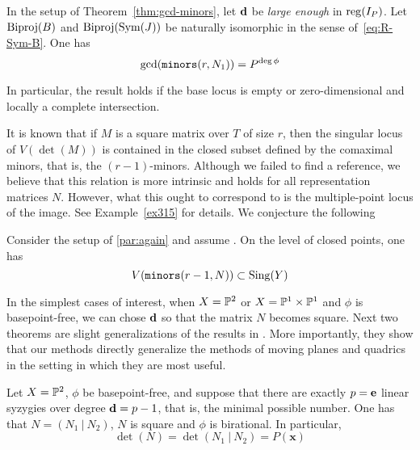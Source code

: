 \documentclass[fleqn,reqno]{amsart}
\begin{document}
\begin{corollary}
\label{cor:approx-complex}
In the setup of Theorem~\ref{thm:gcd-minors}, let $\mathbf d$ be {\em large enough} in $\operatorname{reg}(I_P)$.
Let $\operatorname{Biproj}(B)$ and $\operatorname{Biproj}(\operatorname{Sym}(J))$ be naturally isomorphic in the sense of~\eqref{eq:R-Sym-B}.
One has
\[
	\gcd(\mathop{\tt minors}(r, N_1))=P^{\deg\phi}
\]

In particular, the result holds if the base locus is empty or
zero-dimensional and locally a complete intersection.
\end{corollary}

\begin{paragraf*}
It is known that if $M$ is a square matrix over $T$ of size $r$,
then the singular locus of $V(\det(M))$ is contained in the closed subset defined by the
comaximal minors, that is, the $(r-1)$-minors.
Although we failed to find a reference,
we believe that this relation is more intrinsic and holds for all representation matrices $N$.
However, what this ought to correspond to is the multiple-point locus of the image.
See Example~\ref{ex315} for details.
We conjecture the following
\end{paragraf*}

\begin{conjecture}
\label{conj:sing-locus}
Consider the setup of \eqref{par:again} and assume .
On the level of closed points, one has
\[
	V(\mathop{\tt minors}(r-1,N))\subset\mathrm{Sing}(Y)
\]
\end{conjecture}



\begin{paragraf*}
In the simplest cases of interest, when $X=\mathbb{P}^2$ or $X=\mathbb{P}^1\times\mathbb{P}^1$ and $\phi$ is basepoint-free,
we can chose $\mathbf d$ so that the matrix $N$ becomes square.
Next two theorems are slight generalizations of the results in \citet{CGZ-00}.
More importantly, they show that our methods directly generalize the methods of
moving planes and quadrics in the setting in which they are most useful.
\end{paragraf*}

\begin{theorem}
\label{thm:rel-moving-planes-quadrics}
Let $X=\mathbb{P}^2$, $\phi$ be basepoint-free,
and suppose that there are exactly $p=\mathbf e$ linear syzygies over degree $\mathbf d=p-1$,
that is, the minimal possible number.
One has that $N=(N_1~|~N_2)$, $N$ is square and $\phi$ is birational.
In particular,
\[
	\det(N)=\det(N_1~|~N_2)=P(\mathbf x)
\]
\end{theorem}
\end{document}
